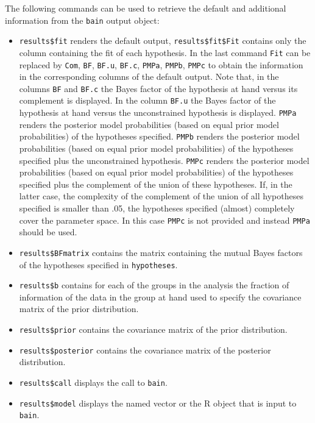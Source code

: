 \documentclass[
]{book}
\providecommand{\tightlist}{%
  \setlength{\itemsep}{0pt}\setlength{\parskip}{0pt}}
\begin{document}
The following commands can be used to
retrieve the default and additional information from the \texttt{bain} output
object:

\begin{itemize}
\tightlist
\item
  \texttt{results\$fit} renders the default output, \texttt{results\$fit\$Fit}
  contains only the column containing the fit of each hypothesis. In the last
  command \texttt{Fit} can be replaced by \texttt{Com}, \texttt{BF}, \texttt{BF.u}, \texttt{BF.c}, \texttt{PMPa},
  \texttt{PMPb}, \texttt{PMPc} to obtain the information in the corresponding columns of the
  default output. Note that, in the columns \texttt{BF} and \texttt{BF.c} the Bayes factor of the
  hypothesis at hand versus its complement is displayed. In the column \texttt{BF.u} the
  Bayes factor of the hypothesis at hand versus the unconstrained hypothesis is
  displayed. \texttt{PMPa} renders the posterior model probabilities (based on equal
  prior model probabilities) of the hypotheses specified. \texttt{PMPb} renders
  the posterior model probabilities (based on equal
  prior model probabilities) of the hypotheses specified plus the unconstrained
  hypothesis. \texttt{PMPc} renders the posterior model probabilities (based on equal
  prior model probabilities) of the hypotheses specified plus the complement of
  the union of these hypotheses. If, in the latter case, the complexity of the
  complement of the union of all hypotheses specified is smaller than .05, the
  hypotheses specified (almost) completely cover the parameter space. In this
  case \texttt{PMPc} is not provided and instead \texttt{PMPa} should be used.
\item
  \texttt{results\$BFmatrix} contains the matrix containing the mutual Bayes
  factors of the hypotheses specified in \texttt{hypotheses}.
\item
  \texttt{results\$b} contains for each of the groups in the analysis the
  fraction of information of the data in the group at hand used to specify the
  covariance matrix of the prior distribution.
\item
  \texttt{results\$prior} contains the covariance matrix of the prior
  distribution.
\item
  \texttt{results\$posterior} contains the covariance matrix of the
  posterior distribution.
\item
  \texttt{results\$call} displays the call to \texttt{bain}.
\item
  \texttt{results\$model} displays the named vector or the R object that is input to \texttt{bain}.

\end{itemize}
\end{document}
